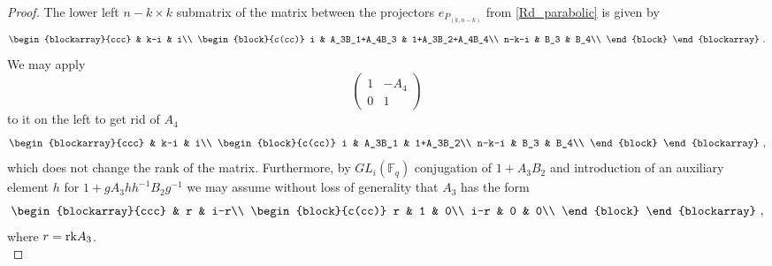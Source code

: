 \documentclass[12pt,reqno]{amsart}
\theoremstyle{definition}
\theoremstyle{remark}
\numberwithin{equation}{section}
\newcommand{\GL}[1]{GL_{#1}(\mathbb{F}_q)}
\begin{document}
\begin{proof}
    The lower left $n-k \times k$ submatrix of the matrix between the projectors $e_{P_{(k,n-k)}}$ from \eqref{Rd_parabolic} is given by
    \[
    \begin{blockarray}{ccc}
     & k-i & i\\
     \begin{block}{c(cc)}
         i & A_3B_1+A_4B_3 & 1+A_3B_2+A_4B_4\\
         n-k-i & B_3 & B_4\\
     \end{block}
    \end{blockarray}\ .
    \]
    We may apply
    \[
    \begin{pmatrix}
        1 & -A_4\\
        0 & 1
    \end{pmatrix}
    \]
    to it on the left to get rid of $A_4$
    \[
    \begin{blockarray}{ccc}
     & k-i & i\\
     \begin{block}{c(cc)}
         i & A_3B_1 & 1+A_3B_2\\
         n-k-i & B_3 & B_4\\
     \end{block}
    \end{blockarray}\ ,
    \]
    which does not change the rank of the matrix. Furthermore, by $\GL{i}$ conjugation of $1+A_3B_2$ and introduction of an auxiliary element $h$ for $1+ gA_3 h h^{-1}B_2 g^{-1}$ we may assume without loss of generality that $A_3$ has the form
    \[
    \begin{blockarray}{ccc}
     & r & i-r\\
     \begin{block}{c(cc)}
         r & 1 & 0\\
         i-r & 0 & 0\\
     \end{block}
    \end{blockarray}\ ,
    \]
    where $r={\rm rk} A_3$.\\


\end{proof}
\end{document}
